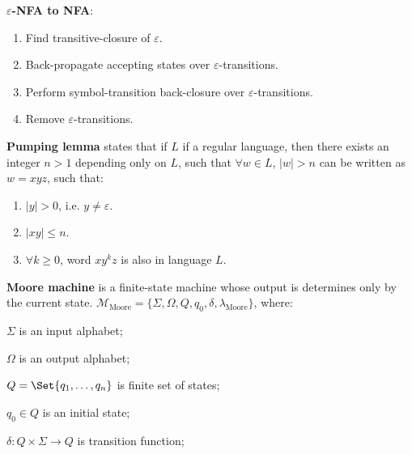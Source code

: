\documentclass[a4paper,10pt]{article}
\begin{document}
\begin{terms}
    \item \textbf{$\varepsilon$-NFA to NFA}:
    \begin{enumerate}
        \item Find transitive-closure of $\varepsilon$.

        \item Back-propagate accepting states over $\varepsilon$-transitions.

        \item Perform symbol-transition back-closure over $\varepsilon$-transitions.

        \item Remove $\varepsilon$-transitions.
    \end{enumerate}

    \item \textbf{Pumping lemma} states that if $L$ if a regular language, then there exists an integer $n > 1$ depending only on $L$, such that $\forall w \in L$, $|w| > n$ can be written as $w = xyz$, such that:
    \begin{enumerate}
        \item $|y| > 0$, i.e. $y \neq \varepsilon$.

        \item $|xy| \leq n$.

        \item $\forall k \geq 0$, word $x y^{k} z$ is also in language $L$.
    \end{enumerate}

    \item \textbf{Moore machine} is a finite-state machine whose output is determines only by the current state.
    $\mathcal{M}_\text{Moore} = \{\Sigma, \Omega, Q, q_0, \delta, \lambda_\text{Moore}\}$, where:
    \begin{terms}
        \item $\Sigma$ is an input alphabet;

        \item $\Omega$ is an output alphabet;

        \item $Q = \Set{q_1, \dots, q_n}$ is finite set of states;

        \item $q_0 \in Q$ is an initial state;

        \item $\delta \colon Q \times \Sigma \to Q$ is transition function;


\end{terms}
\end{terms}
\end{document}
